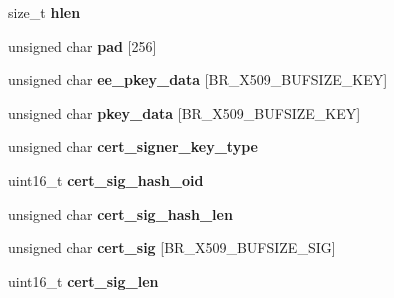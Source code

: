 \begin{DoxyCompactItemize}
\mbox{\label{structbr__x509__minimal__context_a810fd435124a86270d953bd7e2e3f807}} 
size\+\_\+t {\bfseries hlen}
\item 
\mbox{\label{structbr__x509__minimal__context_a773f40f5491f3e177753c581c8cab677}} 
unsigned char {\bfseries pad} \mbox{[}256\mbox{]}
\item 
\mbox{\label{structbr__x509__minimal__context_aeeb606de875b9d66560ececd0a6c2449}} 
unsigned char {\bfseries ee\+\_\+pkey\+\_\+data} \mbox{[}B\+R\+\_\+\+X509\+\_\+\+B\+U\+F\+S\+I\+Z\+E\+\_\+\+K\+EY\mbox{]}
\item 
\mbox{\label{structbr__x509__minimal__context_a951b0c1f8f049320b20fd80fb554855b}} 
unsigned char {\bfseries pkey\+\_\+data} \mbox{[}B\+R\+\_\+\+X509\+\_\+\+B\+U\+F\+S\+I\+Z\+E\+\_\+\+K\+EY\mbox{]}
\item 
\mbox{\label{structbr__x509__minimal__context_aa3de723a0b05d7bae22b3442dacced51}} 
unsigned char {\bfseries cert\+\_\+signer\+\_\+key\+\_\+type}
\item 
\mbox{\label{structbr__x509__minimal__context_aba16db137f2e6074033362d7436e575f}} 
uint16\+\_\+t {\bfseries cert\+\_\+sig\+\_\+hash\+\_\+oid}
\item 
\mbox{\label{structbr__x509__minimal__context_aa25ab141c0dd5bf6123e14cf89085a05}} 
unsigned char {\bfseries cert\+\_\+sig\+\_\+hash\+\_\+len}
\item 
\mbox{\label{structbr__x509__minimal__context_ae3eaa07b5acef89afeed3c705dab363c}} 
unsigned char {\bfseries cert\+\_\+sig} \mbox{[}B\+R\+\_\+\+X509\+\_\+\+B\+U\+F\+S\+I\+Z\+E\+\_\+\+S\+IG\mbox{]}
\item 
\mbox{\label{structbr__x509__minimal__context_aee279a5f9f38633d3031f12544b45548}} 
uint16\+\_\+t {\bfseries cert\+\_\+sig\+\_\+len}
\item 
\mbox{\label{structbr__x509__minimal__context_ae88aed66a3cbf664846d855f7512961c}} 

\end{DoxyCompactItemize}
